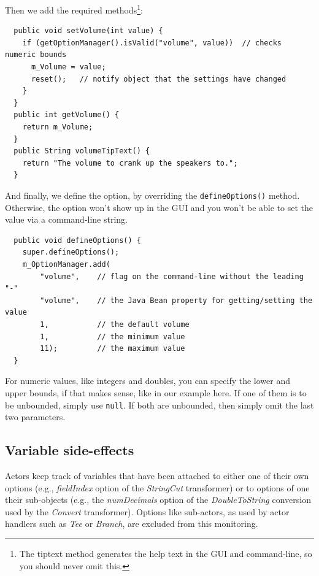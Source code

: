 \noindent Then we add the required methods\footnote{The tiptext method generates
the help text in the GUI and command-line, so you should never omit this.}:
{\small
\begin{verbatim}
  public void setVolume(int value) {
    if (getOptionManager().isValid("volume", value))  // checks numeric bounds
      m_Volume = value;
      reset();   // notify object that the settings have changed
    }
  }
  public int getVolume() {
    return m_Volume;
  }
  public String volumeTipText() {
    return "The volume to crank up the speakers to.";
  }
\end{verbatim}
}

\noindent And finally, we define the option, by overriding the
\texttt{defineOptions()} method. Otherwise, the option won't show up in the GUI and you won't be able to
set the value via a command-line string.
{\small
\begin{verbatim}
  public void defineOptions() {
    super.defineOptions();
    m_OptionManager.add(
	    "volume",    // flag on the command-line without the leading "-"
	    "volume",    // the Java Bean property for getting/setting the value
	    1,           // the default volume
	    1,           // the minimum value
	    11);         // the maximum value
  }
\end{verbatim}
}
For numeric values, like integers and doubles, you can specify the lower and
upper bounds, if that makes sense, like in our example here. If one of them is
to be unbounded, simply use \texttt{null}. If both are unbounded, then simply
omit the last two parameters.

\subsection{Variable side-effects}
Actors keep track of variables that have been attached to either one of their
own options (e.g., \textit{fieldIndex} option of the \textit{StringCut} 
transformer) or to options of one their sub-objects (e.g., the 
\textit{numDecimals} option of the \textit{DoubleToString} conversion used
by the \textit{Convert} transformer). Options like sub-actors, as used by 
actor handlers such as \textit{Tee} or \textit{Branch}, are excluded from this
monitoring.

